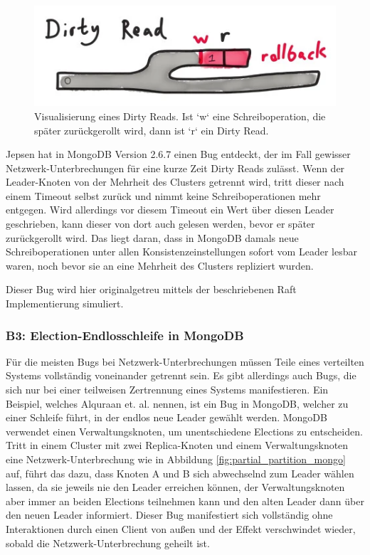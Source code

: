 \documentclass[12pt,a4paper]{report}
\begin{document}
\begin{figure}[H]
	\centering
	\includegraphics[width=0.7\linewidth]{img/dirty_read.png}
	\caption{Visualisierung eines Dirty Reads. Ist `w` eine Schreiboperation, die später zurückgerollt wird, dann ist `r` ein
		Dirty Read. \cite{jepsen_mongo_analysis}}
	\label{fig:dirty_read}
\end{figure}

Jepsen hat in MongoDB Version 2.6.7 einen Bug entdeckt, der im Fall gewisser Netzwerk-Unterbrechungen für eine kurze Zeit Dirty
Reads zulässt. Wenn der Leader-Knoten von der Mehrheit des Clusters getrennt wird, tritt dieser nach einem Timeout selbst zurück
und nimmt keine Schreiboperationen mehr entgegen. Wird allerdings vor diesem Timeout ein Wert über diesen Leader geschrieben, kann
dieser von dort auch gelesen werden, bevor er später zurückgerollt wird. Das liegt daran, dass in MongoDB damals neue
Schreiboperationen unter allen Konsistenzeinstellungen sofort vom Leader lesbar waren, noch bevor sie an eine Mehrheit des
Clusters repliziert wurden. \cite{jepsen_mongo_analysis}

Dieser Bug wird hier originalgetreu mittels der beschriebenen Raft Implementierung simuliert.

\subsubsection{B3: Election-Endlosschleife in MongoDB}
Für die meisten Bugs bei Netzwerk-Unterbrechungen müssen Teile eines verteilten Systems vollständig voneinander getrennt sein. Es
gibt allerdings auch Bugs, die sich nur bei einer teilweisen Zertrennung eines Systems manifestieren. Ein Beispiel, welches
Alquraan et. al. \cite{analysis_of_network_partition_failures} nennen, ist ein Bug in MongoDB, welcher zu einer Schleife führt, in
der endlos neue Leader gewählt werden. MongoDB verwendet einen Verwaltungsknoten, um unentschiedene Elections zu entscheiden.
Tritt in einem Cluster mit zwei Replica-Knoten und einem Verwaltungsknoten eine Netzwerk-Unterbrechung wie in Abbildung
\ref{fig:partial_partition_mongo} auf, führt das dazu, dass Knoten A und B sich abwechselnd zum Leader wählen lassen, da sie jeweils nie
den Leader erreichen können, der Verwaltungsknoten aber immer an beiden Elections teilnehmen kann und den alten Leader dann über
den neuen Leader informiert. Dieser Bug manifestiert sich vollständig ohne Interaktionen durch einen Client von außen und
der Effekt verschwindet wieder, sobald die Netzwerk-Unterbrechung geheilt ist.
\end{document}
